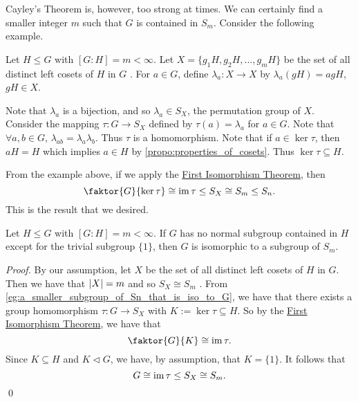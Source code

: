 Cayley's Theorem is, however, too strong at times. We can certainly find a smaller integer $m$ such that $G$ is contained in $S_m$. Consider the following example.

\begin{eg}\label{eg:a_smaller_subgroup_of_Sn_that_is_iso_to_G}
  Let $H \leq G$ with $[G : H] = m < \infty$. Let $X = \{g_1 H, g_2 H, ..., g_m H\}$ be the set of all distinct left cosets of $H$ in $G$ . For $a \in G$, define $\lambda_a : X \to X$ by $\lambda_a (gH) = agH$, $gH \in X$.

  Note that $\lambda_a$ is a bijection, and so $\lambda_a \in S_X$, the permutation group of $X$. Consider the mapping $\tau : G \to S_X$ defined by $\tau (a) = \lambda_a$ for $a \in G$. Note that $\forall a, b \in G$, $\lambda_{ab} = \lambda_a \lambda_b$. Thus $\tau$ is a homomorphism. Note that if $a \in \ker \tau$, then $aH = H$ which implies $a \in H$ by \cref{propo:properties_of_cosets}. Thus $\ker \tau \subseteq H$.
\end{eg}

From the example above, if we apply the \hyperref[thm:first_isomorphism_theorem]{First Isomorphism Theorem}, then
\begin{equation*}
  \faktor{G}{\ker \tau} \cong \img \tau \leq S_X \cong S_m \leq S_n.
\end{equation*}
This is the result that we desired.

\begin{thm}
\label{thm:extended_cayley_s_theorem}
  Let $H \leq G$ with $[G : H] = m < \infty$. If $G$ has no normal subgroup contained in $H$ except for the trivial subgroup $\{1\}$, then $G$ is isomorphic to a subgroup of $S_m$.
\end{thm}

\begin{proof}
  By our assumption, let $X$ be the set of all distinct left cosets of $H$ in $G$. Then we have that $\left|X\right| = m$ and so $S_X \cong S_m$ . From \cref{eg:a_smaller_subgroup_of_Sn_that_is_iso_to_G}, we have that there exists a group homomorphism $\tau : G \to S_X$ with $K := \ker \tau \subseteq H$. So by the \hyperref[thm:first_isomorphism_theorem]{First Isomorphism Theorem}, we have that
  \begin{equation*}
    \faktor{G}{K} \cong \img \tau.
  \end{equation*}
  Since $K \subseteq H$ and $K \triangleleft G$, we have, by assumption, that $K = \{1\}$. It follows that
  \begin{equation*}
    G \cong \operatorname{im} \tau \leq S_X \cong S_m.
  \end{equation*}\qed
\end{proof}

